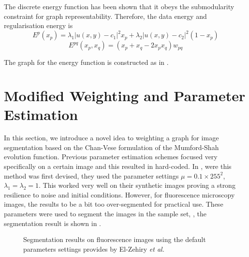 \begin{definition} The discrete energy function  has been shown that it obeys the submodularity constraint for graph representability. Therefore, the data energy and regularisation energy is
	\begin{equation}
		E^p(x_p) = \lambda_1 |u(x,y)-c_1|^2 x_p + \lambda_2 |u(x,y)-c_2|^2 (1-x_p)
	\end{equation}
	\begin{equation}
	E^{pq}(x_p,x_q) = (x_p + x_q - 2x_px_q)w_{pq}
	\end{equation}
\end{definition}
The graph for the energy function is constructed as in \citep{Kolmogorov2004}.

\section{Modified Weighting and Parameter Estimation}
\label{sec:cvgc_weightingandparameterestimation}

In this section, we introduce a novel idea to weighting  a graph for image segmentation based on the Chan-Vese formulation of the Mumford-Shah evolution function. Previous parameter estimation schemes focused very specifically on a certain image and this resulted in hard-coded. In \citep{ElZehiry2007}, were this method was first devised, they used the parameter settings $\mu = 0.1 \times 255^2$, $\lambda_1 = \lambda_2 = 1$. This worked very well on their synthetic images proving a strong resilience to noise and initial conditions. However, for fluorescence microscopy images, the results to be a bit too over-segmented for practical use. These parameters were used to segment the images in the sample set, , the segmentation result is shown in .

\begin{figure}[!h]
	\centering
	\caption{Segmentation results on fluorescence images using the default parameters settings provides by El-Zehiry \textit{et al.}}
	\label{fig:samplesetdefaultcv}
\end{figure}

